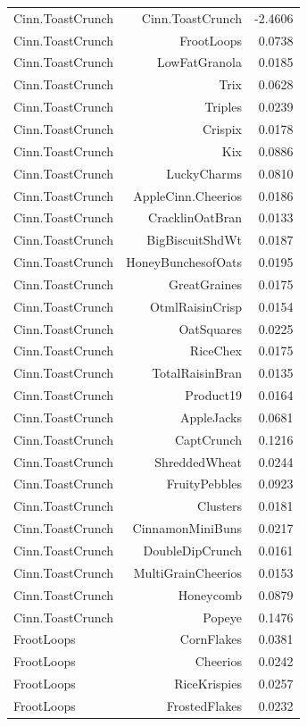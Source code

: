 \begin{longtable}{@{}lrr@{}}
Cinn.ToastCrunch & Cinn.ToastCrunch & -2.4606 \\
Cinn.ToastCrunch & FrootLoops & 0.0738 \\
Cinn.ToastCrunch & LowFatGranola & 0.0185 \\
Cinn.ToastCrunch & Trix & 0.0628 \\
Cinn.ToastCrunch & Triples & 0.0239 \\
Cinn.ToastCrunch & Crispix & 0.0178 \\
Cinn.ToastCrunch & Kix & 0.0886 \\
Cinn.ToastCrunch & LuckyCharms & 0.0810 \\
Cinn.ToastCrunch & AppleCinn.Cheerios & 0.0186 \\
Cinn.ToastCrunch & CracklinOatBran & 0.0133 \\
Cinn.ToastCrunch & BigBiscuitShdWt & 0.0187 \\
Cinn.ToastCrunch & HoneyBunchesofOats & 0.0195 \\
Cinn.ToastCrunch & GreatGraines & 0.0175 \\
Cinn.ToastCrunch & OtmlRaisinCrisp & 0.0154 \\
Cinn.ToastCrunch & OatSquares & 0.0225 \\
Cinn.ToastCrunch & RiceChex & 0.0175 \\
Cinn.ToastCrunch & TotalRaisinBran & 0.0135 \\
Cinn.ToastCrunch & Product19 & 0.0164 \\
Cinn.ToastCrunch & AppleJacks & 0.0681 \\
Cinn.ToastCrunch & CaptCrunch & 0.1216 \\
Cinn.ToastCrunch & ShreddedWheat & 0.0244 \\
Cinn.ToastCrunch & FruityPebbles & 0.0923 \\
Cinn.ToastCrunch & Clusters & 0.0181 \\
Cinn.ToastCrunch & CinnamonMiniBuns & 0.0217 \\
Cinn.ToastCrunch & DoubleDipCrunch & 0.0161 \\
Cinn.ToastCrunch & MultiGrainCheerios & 0.0153 \\
Cinn.ToastCrunch & Honeycomb & 0.0879 \\
Cinn.ToastCrunch & Popeye & 0.1476 \\
FrootLoops & CornFlakes & 0.0381 \\
FrootLoops & Cheerios & 0.0242 \\
FrootLoops & RiceKrispies & 0.0257 \\
FrootLoops & FrostedFlakes & 0.0232 \\

\end{longtable}
